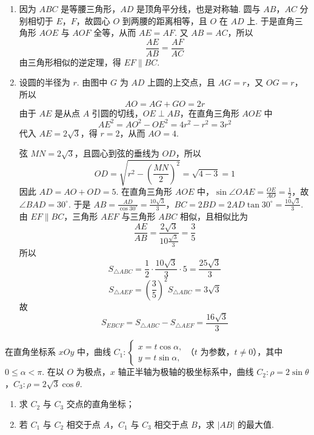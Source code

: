 \begin{solution}
\begin{enumerate}
\item 因为 \(ABC\) 是等腰三角形，\(AD\) 是顶角平分线，也是对称轴. 圆与 \(AB\)，\(AC\) 分别相切于 \(E\)，\(F\)，故圆心 \(O\) 到两腰的距离相等，且 \(O\) 在 \(AD\) 上. 于是直角三角形 \(AOE\) 与 \(AOF\) 全等，从而 \(AE=AF\). 又 \(AB=AC\)，所以
\[
\frac{AE}{AB}=\frac{AF}{AC}
\]
由三角形相似的逆定理，得 \(EF\parallel BC\).

\item 设圆的半径为 \(r\). 由图中 \(G\) 为 \(AD\) 上圆的上交点，且 \(AG=r\)，又 \(OG=r\)，所以
\[
AO=AG+GO=2r
\]
由于 \(AE\) 是从点 \(A\) 引圆的切线，\(OE\perp AB\)，在直角三角形 \(AOE\) 中
\[
AE^{2}=AO^{2}-OE^{2}=4r^{2}-r^{2}=3r^{2}
\]
代入 \(AE=2\sqrt3\)，得 \(r=2\)，从而 \(AO=4\).

弦 \(MN=2\sqrt3\)，且圆心到弦的垂线为 \(OD\)，所以
\[
OD=\sqrt{r^{2}-\left(\frac{MN}{2}\right)^{2}}=\sqrt{4-3}=1
\]
因此 \(AD=AO+OD=5\). 在直角三角形 \(AOE\) 中，\(\sin\angle OAE=\frac{OE}{AO}=\frac{1}{2}\)，故 \(\angle BAD=30^{\circ}\). 于是
\(AB=\frac{AD}{\cos30^{\circ}}=\frac{10\sqrt3}{3}\)，\(BC=2BD=2AD\tan30^{\circ}=\frac{10\sqrt3}{3}\).
由 \(EF\parallel BC\)，三角形 \(AEF\) 与三角形 \(ABC\) 相似，且相似比为
\[
\frac{AE}{AB}=\frac{2\sqrt3}{10\frac{\sqrt3}{3}}=\frac35
\]
所以
\[
S_{\triangle ABC}=\frac12\cdot\frac{10\sqrt3}{3}\cdot5=\frac{25\sqrt3}{3}
\]
\[
S_{\triangle AEF}=\left(\frac35\right)^{2}S_{\triangle ABC}=3\sqrt3
\]
故
\[
S_{EBCF}=S_{\triangle ABC}-S_{\triangle AEF}=\frac{16\sqrt3}{3}
\]
\end{enumerate}
\end{solution}

\begin{problem}
在直角坐标系 \(xOy\) 中，曲线 \(C_1: \begin{cases}
x = t\cos \alpha,\\
y = t\sin \alpha,
\end{cases}\)（\(t\) 为参数，\(t \neq 0\)），其中 \(0 \leqslant \alpha < \pi\). 在以 \(O\) 为极点，\(x\) 轴正半轴为极轴的极坐标系中，曲线 \(C_2: \rho = 2\sin \theta\)，\(C_3: \rho = 2\sqrt{3}\cos \theta\).
\begin{enumerate}
\item 求 \(C_2\) 与 \(C_3\) 交点的直角坐标；
\item 若 \(C_1\) 与 \(C_2\) 相交于点 \(A\)，\(C_1\) 与 \(C_3\) 相交于点 \(B\)，求 \(|AB|\) 的最大值.
\end{enumerate}
\end{problem}

